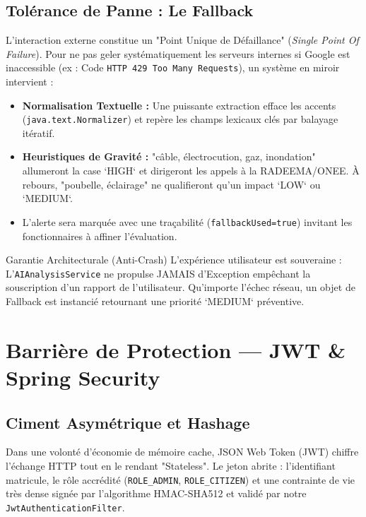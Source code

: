 \documentclass[12pt,a4paper,oneside]{book} %
\begin{document}
\subsection{Tolérance de Panne : Le Fallback}
L'interaction externe constitue un "Point Unique de Défaillance" (\textit{Single Point Of Failure}). Pour ne pas geler systématiquement les serveurs internes si Google est inaccessible  (ex : Code \texttt{HTTP 429 Too Many Requests}), un système en miroir intervient :
\begin{itemize}
  \item \textbf{Normalisation Textuelle :} Une puissante extraction efface les accents (\texttt{java.text.Normalizer}) et repère les champs lexicaux clés par balayage itératif.
  \item \textbf{Heuristiques de Gravité :} "câble, électrocution, gaz, inondation" allumeront la case `HIGH` et dirigeront les appels à la RADEEMA/ONEE.  À rebours, "poubelle, éclairage" ne qualifieront qu'un impact `LOW` ou `MEDIUM`. 
  \item L'alerte sera marquée avec une traçabilité (\texttt{fallbackUsed=true}) invitant les fonctionnaires à affiner l'évaluation.
\end{itemize}

\begin{infobox}{Garantie Architecturale (Anti-Crash)}
L'expérience utilisateur est souveraine : L'\texttt{AIAnalysisService} ne propulse JAMAIS d'Exception empêchant la souscription d'un rapport de l'utilisateur. Qu'importe l'échec réseau, un objet de Fallback est instancié retournant une priorité `MEDIUM` préventive.
\end{infobox}

\section{Barrière de Protection — JWT \& Spring Security}

\subsection{Ciment Asymétrique et Hashage}
Dans une volonté d'économie de mémoire cache, JSON Web Token (JWT) chiffre l'échange HTTP tout en le rendant "Stateless". Le jeton abrite : l'identifiant matricule, le rôle accrédité (\texttt{ROLE\_ADMIN}, \texttt{ROLE\_CITIZEN}) et une contrainte de vie très dense signée par l'algorithme HMAC-SHA512 et validé par notre \texttt{JwtAuthenticationFilter}.
\end{document}
